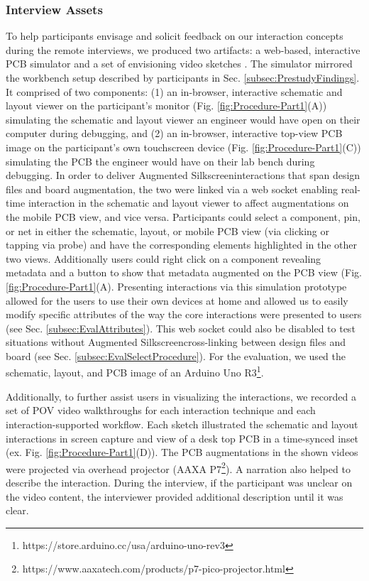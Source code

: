 \documentclass [11pt, proquest] {uwthesis}[2020/02/24]
\newcommand{\ASname}{Augmented Silkscreen}
\begin{document}
\subsubsection{Interview Assets}
To help participants envisage and solicit feedback on our interaction concepts during the remote interviews, we produced two artifacts: a web-based, interactive PCB simulator and a set of envisioning video sketches \cite{Vertelney1989UsingInterfaces}. The simulator mirrored the workbench setup described by participants in Sec. \ref{subsec:PrestudyFindings}. It comprised of two components: (1) an in-browser, interactive schematic and layout viewer on the participant's monitor (Fig. \ref{fig:Procedure-Part1}(A)) simulating the schematic and layout viewer an engineer would have open on their computer during debugging, and (2) an in-browser, interactive top-view PCB image on the participant's own touchscreen device (Fig. \ref{fig:Procedure-Part1}(C)) simulating the PCB the engineer would have on their lab bench during debugging. In order to deliver \ASname interactions that span design files and board augmentation, the two were linked via a web socket enabling real-time interaction in the schematic and layout viewer to affect augmentations on the mobile PCB view, and vice versa. Participants could select a component, pin, or net in either the schematic, layout, or mobile PCB view (via clicking or tapping via probe) and have the corresponding elements highlighted in the other two views. Additionally users could right click on a component revealing metadata and a button to show that metadata augmented on the PCB view (Fig. \ref{fig:Procedure-Part1}(A). Presenting interactions via this simulation prototype allowed for the users to use their own devices at home and allowed us to easily modify specific attributes of the way the core interactions were presented to users (see Sec. \ref{subsec:EvalAttributes}). This web socket could also be disabled to test situations without \ASname cross-linking between design files and board (see Sec. \ref{subsec:EvalSelectProcedure}). For the evaluation, we used the schematic, layout, and PCB image of an Arduino Uno R3\footnote{https://store.arduino.cc/usa/arduino-uno-rev3}.

Additionally, to further assist users in visualizing the interactions, we recorded a set of POV video walkthroughs for each interaction technique and each interaction-supported workflow. Each sketch illustrated the schematic and layout interactions in screen capture and view of a desk top PCB in a time-synced inset (ex. Fig. \ref{fig:Procedure-Part1}(D)). The PCB augmentations in the shown videos were projected via overhead projector (AAXA P7\footnote{https://www.aaxatech.com/products/p7-pico-projector.html}). A narration also helped to describe the interaction. During the interview, if the participant was unclear on the video content, the interviewer provided additional description until it was clear.
\end{document}
